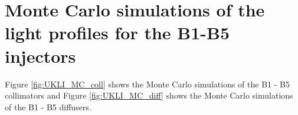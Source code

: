 \begin{figure}[!htbp]
        
    \end{figure}

\section{Monte Carlo simulations of the light profiles for the B1-B5 injectors}
    

Figure \ref{fig:UKLI_MC_coll} shows the Monte Carlo simulations of the B1 - B5 collimators and Figure \ref{fig:UKLI_MC_diff} shows the Monte Carlo simulations of the B1 - B5 diffusers.

